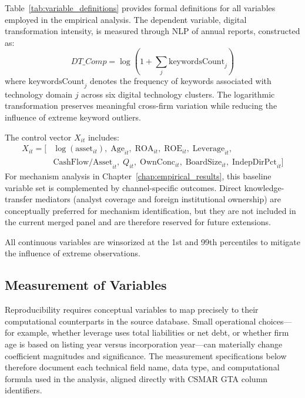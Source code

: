 Table~\ref{tab:variable_definitions} provides formal definitions for all variables employed in the empirical analysis. The dependent variable, digital transformation intensity, is measured through NLP of annual reports, constructed as:
\begin{equation}
\label{eq:dt_comp}
DT\_Comp = \log\left(1 + \sum_{j} \mathrm{keywordsCount}_j\right)
\end{equation}
where $\mathrm{keywordsCount}_j$ denotes the frequency of keywords associated with technology domain $j$ across six digital technology clusters. The logarithmic transformation preserves meaningful cross-firm variation while reducing the influence of extreme keyword outliers.

The control vector $X_{it}$ includes:
\begin{equation}
\label{eq:control_vector}
\begin{aligned}
X_{it} = [&\log(\mathrm{asset}_{it}),\; \mathrm{Age}_{it},\; \mathrm{ROA}_{it},\; \mathrm{ROE}_{it},\; \mathrm{Leverage}_{it},\\
&\mathrm{CashFlow/Asset}_{it},\; Q_{it},\; \mathrm{OwnConc}_{it},\; \mathrm{BoardSize}_{it},\; \mathrm{IndepDirPct}_{it}]
\end{aligned}
\end{equation}
For mechanism analysis in Chapter~\ref{chap:empirical_results}, this baseline variable set is complemented by channel-specific outcomes. Direct knowledge-transfer mediators (analyst coverage and foreign institutional ownership) are conceptually preferred for mechanism identification, but they are not included in the current merged panel and are therefore reserved for future extensions.

All continuous variables are winsorized at the 1st and 99th percentiles to mitigate the influence of extreme observations.

\subsection{Measurement of Variables}

Reproducibility requires conceptual variables to map precisely to their computational counterparts in the source database. Small operational choices---for example, whether leverage uses total liabilities or net debt, or whether firm age is based on listing year versus incorporation year---can materially change coefficient magnitudes and significance. The measurement specifications below therefore document each technical field name, data type, and computational formula used in the analysis, aligned directly with CSMAR GTA column identifiers.

